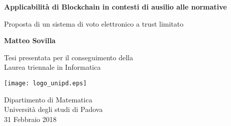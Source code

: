 \begin{titlepage}
    \begin{center}
        \vspace*{1cm}
        
        \Huge
        \textbf{Applicabilità di Blockchain in contesti di ausilio alle normative}
        
        \vspace{0.5cm}
        \large
        Proposta di un sistema di voto elettronico a trust limitato
        
        \vspace{1.5cm}
        
        \textbf{Matteo Sovilla}
        
        \vspace{1cm}
        
        Tesi presentata per il conseguimento della\\
        Laurea triennale in Informatica
        
        \vspace{0.8cm}
        
        \texttt{[image: logo\_unipd.eps]}

        \vspace{0.5cm}
        
        \large
        Dipartimento di Matematica\\
        Università degli studi di Padova\\
        31 Febbraio 2018
        
    \end{center}
\end{titlepage}